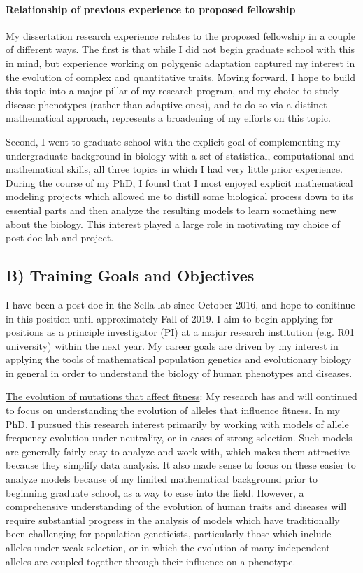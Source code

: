 \documentclass[11pt]{article}
\begin{document}
\paragraph{Relationship of previous experience to proposed fellowship}

My dissertation research experience relates to the proposed fellowship in a couple of different ways. The first is that while I did not begin graduate school with this in mind, but experience working on polygenic adaptation captured my interest in the evolution of complex and quantitative traits. Moving forward, I hope to build this topic into a major pillar of my research program, and my choice to study disease phenotypes (rather than adaptive ones), and to do so via a distinct mathematical approach, represents a broadening of my efforts on this topic.

Second, I went to graduate school with the explicit goal of complementing my undergraduate background in biology with a set of statistical, computational and mathematical skills, all three topics in which I had very little prior experience. During the course of my PhD, I found that I most enjoyed explicit mathematical modeling projects which allowed me to distill some biological process down to its essential parts and then analyze the resulting models to learn something new about the biology. This interest played a large role in motivating my choice of post-doc lab and project.



\subsection*{B) Training Goals and Objectives}

I have been a post-doc in the Sella lab since October 2016, and hope to conitinue in this position until approximately Fall of 2019. I aim to begin applying for positions as a principle investigator (PI) at a major research institution (e.g. R01 university) within the next year. My career goals are driven by my interest in applying the tools of mathematical population genetics and evolutionary biology in general in order to understand the biology of human phenotypes and diseases.

\underline{The evolution of mutations that affect fitness}: My research has and will continued to focus on understanding the evolution of alleles that influence fitness. In my PhD, I pursued this research interest primarily by working with models of allele frequency evolution under neutrality, or in cases of strong selection. Such models are generally fairly easy to analyze and work with, which makes them attractive because they simplify data analysis. It also made sense to focus on these easier to analyze models because of my limited mathematical background prior to beginning graduate school, as a way to ease into the field. However, a comprehensive understanding of the evolution of human traits and diseases will require substantial progress in the analysis of models which have traditionally been challenging for population geneticists, particularly those which include alleles under weak selection, or in which the evolution of many independent alleles are coupled together through their influence on a phenotype.
\end{document}
